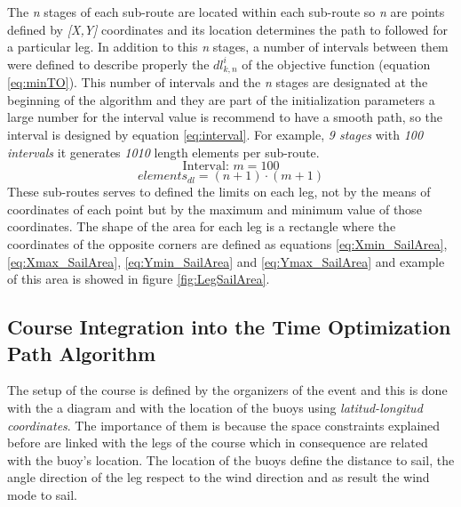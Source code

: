 The \textit{n} stages of each sub-route are located within each sub-route so \textit{n} are points defined by \textit{[X,Y]} coordinates and its location determines the path to followed for a particular leg. In addition to this \textit{n} stages, a number of intervals between them were defined to describe properly the $dl_{k,n}^{i}$ of the objective function (equation \ref{eq:minTO}).  This number of intervals and the \textit{n} stages are designated at the beginning of the algorithm and they are part of the initialization parameters a large number for the interval value is recommend to have a smooth path, so the interval is designed by equation \ref{eq:interval}. For example, \textit{9 stages} with \textit{100 intervals} it generates \textit{1010} length elements per sub-route. 
\begin{equation} \label{eq:interval}
   \text{Interval: }  m=100
\end{equation}
\begin{equation} \label{eq:interval-example}
  elements_{dl}=(n+1) \cdot (m+1)
\end{equation}
These sub-routes serves to defined the limits on each leg, not by the means of coordinates of each point but by the maximum and minimum value of those coordinates. The shape of the area for each leg is a rectangle where the coordinates of the opposite corners are defined as equations \ref{eq:Xmin_SailArea}, \ref{eq:Xmax_SailArea}, \ref{eq:Ymin_SailArea} and \ref{eq:Ymax_SailArea} and example of this area is showed in figure \ref{fig:LegSailArea}.\par 
\subsection{Course Integration into the Time Optimization Path Algorithm} \label{sec:Coure_LegIntegration}

The setup of the course is defined by the organizers of the event and this is done with the a diagram and with the location of the buoys using \textit{latitud-longitud coordinates}. The importance of them is because the space constraints explained before are linked with the legs of the course which in consequence are related with the buoy's location. The location of the buoys define the distance to sail, the angle direction of the leg respect to the wind direction and as result the wind mode to sail. \par 


